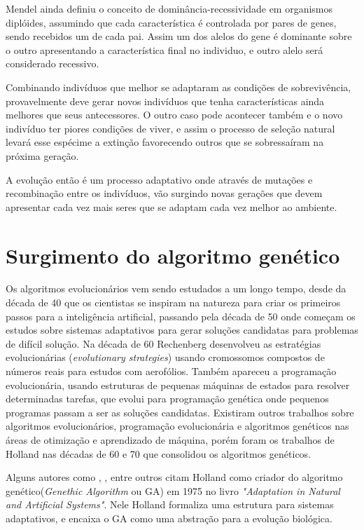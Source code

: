 Mendel ainda definiu o conceito de dominância-recessividade em organismos diplóides, assumindo que cada característica é controlada por pares de genes, sendo recebidos um de cada pai. Assim um dos alelos do gene é dominante sobre o outro apresentando a característica final no individuo, e outro alelo será considerado recessivo.

Combinando indivíduos que melhor se adaptaram as condições de sobrevivência, provavelmente deve gerar novos indivíduos que tenha características ainda melhores que seus antecessores. O outro caso pode acontecer também e o novo indivíduo ter piores condições de viver, e assim o processo de seleção natural levará esse espécime a extinção favorecendo outros que se sobressaíram na próxima geração.

A evolução então é um processo adaptativo onde através de mutações e recombinação entre os indivíduos, vão surgindo novas gerações que devem apresentar cada vez mais seres que se adaptam cada vez melhor ao ambiente.

\section{Surgimento do algoritmo genético}

Os algoritmos evolucionários vem sendo estudados a um longo tempo, desde da década de 40 que os cientistas se inspiram na natureza para criar os primeiros passos para a inteligência artificial, passando pela década de 50 onde começam os estudos sobre sistemas adaptativos para gerar soluções candidatas para problemas de difícil solução. Na década de 60 Rechenberg desenvolveu as estratégias evolucionárias (\textit{evolutionary strategies}) usando cromossomos compostos de números reais para estudos com aerofólios. Também apareceu a programação evolucionária, usando estruturas de pequenas máquinas de estados para resolver determinadas tarefas, que evolui para programação genética onde pequenos programas passam a ser as soluções candidatas. Existiram outros trabalhos sobre algoritmos evolucionários, programação evolucionária e algoritmos genéticos nas áreas de otimização e aprendizado de máquina, porém foram os trabalhos de Holland nas décadas de 60 e 70 que consolidou os algoritmos genéticos. \cite{Mitchell1996, Linden2008}

Alguns autores como \citeauthor{Mitchell1996}, \citeauthor{LeeJacobson2015}, \citeauthor{Kwong2001} entre outros citam Holland como criador do algoritmo genético(\textit{Genethic Algorithm} ou GA) em 1975 no livro \textit{"Adaptation in Natural and Artificial Systems"}. Nele Holland formaliza uma estrutura para sistemas adaptativos, e encaixa o GA como uma abstração para a evolução biológica.

